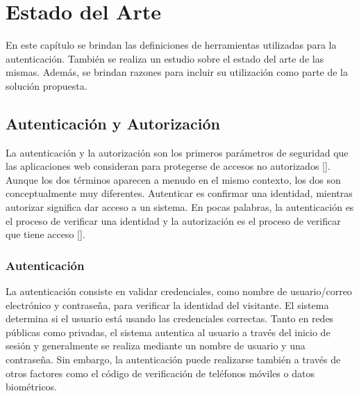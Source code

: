 
\chapter{Estado del Arte}\label{chapter:state-of-the-art}
En este capítulo se brindan las definiciones de herramientas utilizadas para la autenticación. También se realiza un estudio sobre el estado del arte de las mismas. Además, se brindan razones para incluir su utilización como parte de la solución propuesta.

\section{Autenticación y Autorización}
La autenticación y la autorización son los primeros parámetros de seguridad que las aplicaciones web consideran para protegerse de accesos no autorizados [\cite{deitel2014como}].  Aunque los dos términos aparecen a menudo en el mismo contexto, los dos son conceptualmente muy diferentes. Autenticar es confirmar una identidad, mientras autorizar significa dar acceso a un sistema. En pocas palabras, la autenticación es el proceso de verificar una identidad y la autorización es el proceso de verificar que tiene acceso [\cite{ye2022diseno}].

\subsection{Autenticación}
La autenticación consiste en validar credenciales, como nombre de usuario/correo electrónico y contraseña, para verificar la identidad del visitante. El sistema determina si el usuario está usando las credenciales correctas. Tanto en redes públicas como privadas, el sistema autentica al usuario a través del inicio de sesión y generalmente se realiza mediante un nombre de usuario y
una contraseña. Sin embargo, la autenticación puede realizarse  también a través de otros factores como el código de verificación de teléfonos móviles o datos biométricos.

